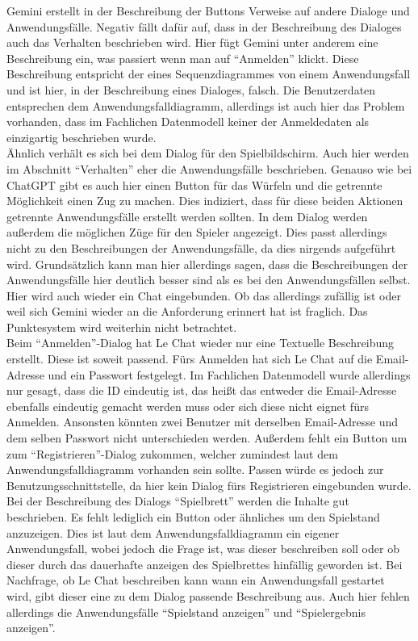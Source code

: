 Gemini erstellt in der Beschreibung der Buttons Verweise auf andere Dialoge und Anwendungsfälle. Negativ fällt dafür auf, 
dass in der Beschreibung des Dialoges auch das Verhalten beschrieben wird. Hier fügt Gemini unter anderem eine Beschreibung ein, was passiert wenn 
man auf ``Anmelden'' klickt. Diese Beschreibung entspricht der eines Sequenzdiagrammes von einem Anwendungsfall und ist hier, in der Beschreibung eines 
Dialoges, falsch. Die Benutzerdaten entsprechen dem Anwendungsfalldiagramm, allerdings ist auch hier das Problem vorhanden, dass im Fachlichen Datenmodell
keiner der Anmeldedaten als einzigartig beschrieben wurde.\\
Ähnlich verhält es sich bei dem Dialog für den Spielbildschirm. Auch hier werden im Abschnitt ``Verhalten'' eher die Anwendungsfälle beschrieben. Genauso 
wie bei ChatGPT gibt es auch hier einen Button für das Würfeln und die getrennte Möglichkeit einen Zug zu machen. Dies indiziert, dass für diese beiden 
Aktionen getrennte Anwendungsfälle erstellt werden sollten. In dem Dialog werden außerdem die möglichen Züge für den Spieler angezeigt. Dies passt 
allerdings nicht zu den Beschreibungen der Anwendungsfälle, da dies nirgends aufgeführt wird. Grundsätzlich kann man hier allerdings sagen, dass die 
Beschreibungen der Anwendungsfälle hier deutlich besser sind als es bei den Anwendungsfällen selbst. Hier wird auch wieder ein Chat eingebunden. Ob 
das allerdings zufällig ist oder weil sich Gemini wieder an die Anforderung erinnert hat ist fraglich. Das Punktesystem wird weiterhin nicht betrachtet.\\

Beim ``Anmelden''-Dialog hat Le Chat wieder nur eine Textuelle Beschreibung erstellt. Diese ist soweit passend. Fürs Anmelden hat sich Le Chat auf die 
Email-Adresse und ein Passwort festgelegt. Im Fachlichen Datenmodell wurde allerdings nur gesagt, dass die ID eindeutig ist, das heißt das entweder 
die Email-Adresse ebenfalls eindeutig gemacht werden muss oder sich diese nicht eignet fürs Anmelden. Ansonsten könnten zwei Benutzer mit derselben
Email-Adresse und dem selben Passwort nicht unterschieden werden. Außerdem fehlt ein Button um zum ``Registrieren''-Dialog zukommen, welcher zumindest
laut dem Anwendungsfalldiagramm vorhanden sein sollte. Passen würde es jedoch zur Benutzungsschnittstelle, da hier kein Dialog fürs Registrieren
eingebunden wurde.\\
Bei der Beschreibung des Dialogs ``Spielbrett'' werden die Inhalte gut beschrieben. Es fehlt lediglich ein Button oder ähnliches um den Spielstand 
anzuzeigen. Dies ist laut dem Anwendungsfalldiagramm ein eigener Anwendungsfall, wobei jedoch die Frage ist, was dieser beschreiben soll oder ob dieser
durch das dauerhafte anzeigen des Spielbrettes hinfällig geworden ist. Bei Nachfrage, ob Le Chat beschreiben kann wann ein Anwendungsfall gestartet wird,
gibt dieser eine zu dem Dialog passende Beschreibung aus. Auch hier fehlen allerdings die Anwendungsfälle ``Spielstand anzeigen'' und ``Spielergebnis anzeigen''.\\

